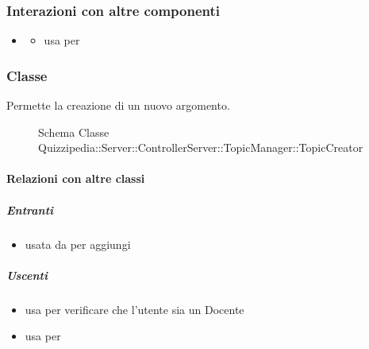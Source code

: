\subsubsection{Interazioni con altre componenti}
\begin{itemize}
\item {}
\begin{itemize}
\item usa  per 
\end{itemize}
\end{itemize}
\subsubsection{Classe }
Permette la creazione di un nuovo argomento.
\begin{figure}[H]
\centering
\noindent{}
\caption[Schema Classe TopicCreator]{Schema Classe Quizzipedia::Server::ControllerServer::TopicManager::TopicCreator}
\end{figure}
\paragraph{Relazioni con altre classi}
\subparagraph{Entranti}
\begin{itemize}
\item usata da  per aggiungi
\end{itemize}
\subparagraph{Uscenti}
\begin{itemize}
\item usa  per verificare che l'utente sia un Docente
\item usa  per 
\end{itemize}
